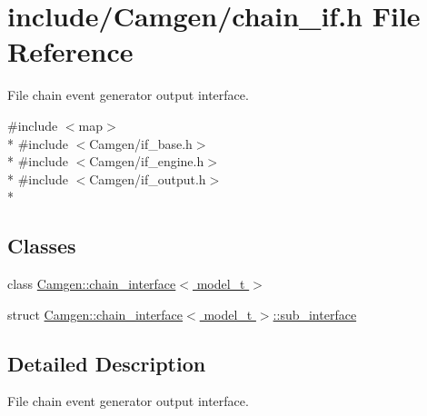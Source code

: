 \hypertarget{a00589}{\section{include/\-Camgen/chain\-\_\-if.h File Reference}
\label{a00589}
}


File chain event generator output interface.  


{\ttfamily \#include $<$map$>$}\\*
{\ttfamily \#include $<$Camgen/if\-\_\-base.\-h$>$}\\*
{\ttfamily \#include $<$Camgen/if\-\_\-engine.\-h$>$}\\*
{\ttfamily \#include $<$Camgen/if\-\_\-output.\-h$>$}\\*
\subsection*{Classes}
\begin{DoxyCompactItemize}
\item 
class \hyperlink{a00066}{Camgen\-::chain\-\_\-interface$<$ model\-\_\-t $>$}
\item 
struct \hyperlink{a00512}{Camgen\-::chain\-\_\-interface$<$ model\-\_\-t $>$\-::sub\-\_\-interface}
\end{DoxyCompactItemize}


\subsection{Detailed Description}
File chain event generator output interface. 